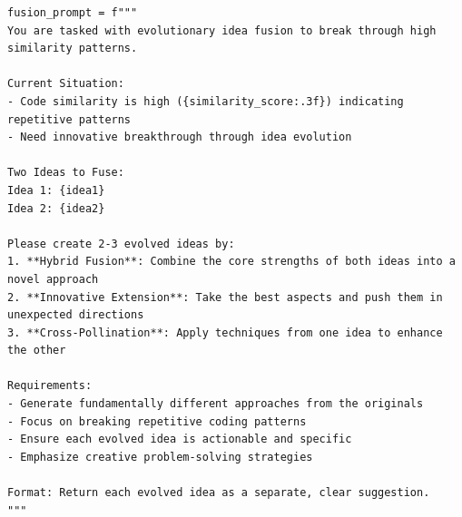 \documentclass[11pt]{article}
\theoremstyle{definition}
\theoremstyle{remark}
\begin{document}
\clearpage

\begin{tcolorbox}[notitle, sharp corners, breakable, colframe=black, colback=white, 
       boxrule=3pt, boxsep=0.5pt, enhanced, 
       shadow={3pt}{-3pt}{0pt}{opacity=1,mygrey},
       title={Idea Fusion Prompt},]\label{box:idea-fusion-prompt}
       \scriptsize
       
\begin{lstlisting}
fusion_prompt = f"""
You are tasked with evolutionary idea fusion to break through high similarity patterns.

Current Situation:
- Code similarity is high ({similarity_score:.3f}) indicating repetitive patterns
- Need innovative breakthrough through idea evolution

Two Ideas to Fuse:
Idea 1: {idea1}
Idea 2: {idea2}

Please create 2-3 evolved ideas by:
1. **Hybrid Fusion**: Combine the core strengths of both ideas into a novel approach
2. **Innovative Extension**: Take the best aspects and push them in unexpected directions  
3. **Cross-Pollination**: Apply techniques from one idea to enhance the other

Requirements:
- Generate fundamentally different approaches from the originals
- Focus on breaking repetitive coding patterns
- Ensure each evolved idea is actionable and specific
- Emphasize creative problem-solving strategies

Format: Return each evolved idea as a separate, clear suggestion.
"""
\end{lstlisting}
\end{tcolorbox}






\end{document}
